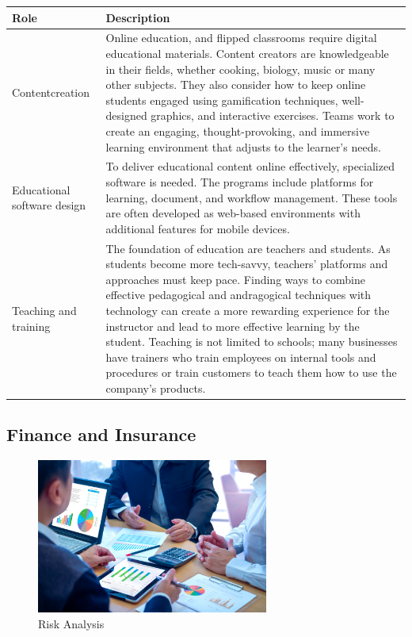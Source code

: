 \begin{table}[H]
	\begin{center}
		\begin{tabular}{p{1in}|p{3.4in}} 
			\textbf{Role} & \textbf{Description}\\
			\hline
			Content\linebreak creation & Online education, and flipped classrooms require digital educational materials. Content creators are knowledgeable in their fields, whether cooking, biology, music or many other subjects. They also consider how to keep online students engaged using gamification techniques, well-designed graphics, and interactive exercises. Teams work to create an engaging, thought-provoking, and immersive learning environment that adjusts to the learner's needs.\\
			\hline
			Educational software design & To deliver educational content online effectively, specialized software is needed. The programs include platforms for learning, document, and workflow management. These tools are often developed as web-based environments with additional features for mobile devices.\\
			\hline
			Teaching and training & The foundation of education are teachers and students. As students become more tech-savvy, teachers' platforms and approaches must keep pace. Finding ways to combine effective pedagogical and andragogical techniques with technology can create a more rewarding experience for the instructor and lead to more effective learning by the student. Teaching is not limited to schools; many businesses have trainers who train employees on internal tools and procedures or train customers to teach them how to use the company's products.\\
			\hline
		\end{tabular}
	\end{center}
\end{table}

\subsection{Finance and Insurance}

\begin{figure}[H]
	\begin{center}
		\caption{Risk Analysis}
		\vskip 4pt
		\includegraphics[height=2in]{images/careers/iStock-1210565724.small.jpg}
	\end{center}
\end{figure}

